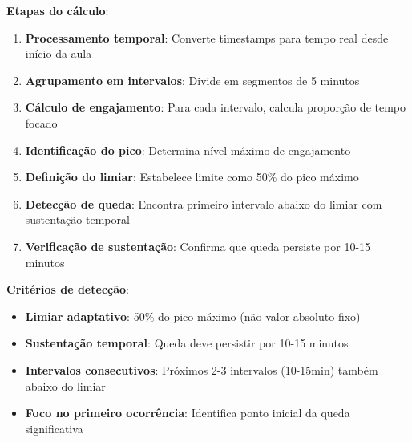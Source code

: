 % 

\textbf{Etapas do cálculo}:
\begin{enumerate}
    \item \textbf{Processamento temporal}: Converte timestamps para tempo real desde início da aula
    \item \textbf{Agrupamento em intervalos}: Divide em segmentos de 5 minutos
    \item \textbf{Cálculo de engajamento}: Para cada intervalo, calcula proporção de tempo focado
    \item \textbf{Identificação do pico}: Determina nível máximo de engajamento
    \item \textbf{Definição do limiar}: Estabelece limite como 50\% do pico máximo
    \item \textbf{Detecção de queda}: Encontra primeiro intervalo abaixo do limiar com sustentação temporal
    \item \textbf{Verificação de sustentação}: Confirma que queda persiste por 10-15 minutos
\end{enumerate}

\textbf{Critérios de detecção}:
\begin{itemize}
    \item \textbf{Limiar adaptativo}: 50\% do pico máximo (não valor absoluto fixo)
    \item \textbf{Sustentação temporal}: Queda deve persistir por 10-15 minutos
    \item \textbf{Intervalos consecutivos}: Próximos 2-3 intervalos (10-15min) também abaixo do limiar
    \item \textbf{Foco no primeiro ocorrência}: Identifica ponto inicial da queda significativa
\end{itemize}